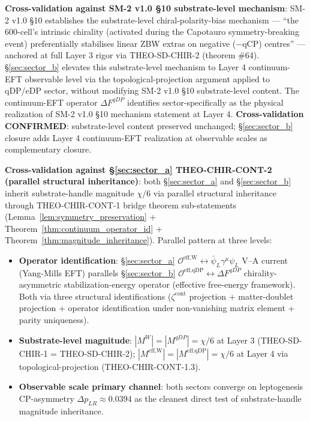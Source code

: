 \documentclass[11pt,letterpaper]{article}
\newcommand{\DeltapLR}{\Delta p_{LR}}
\newcommand{\OeffW}{\mathcal{O}^{\text{eff,W}}}
\newcommand{\OeffqDP}{\mathcal{O}^{\text{eff,qDP}}}
\newcommand{\DeltaFqDP}{\Delta F^{qDP}}
\begin{document}
\textbf{Cross-validation against SM-2 v1.0 §10 substrate-level mechanism}: SM-2 v1.0 §10 establishes the substrate-level chiral-polarity-bias mechanism --- ``the 600-cell's intrinsic chirality (activated during the Capotauro symmetry-breaking event) preferentially stabilises linear ZBW extras on negative ($-$qCP) centres'' \cite{SM2v1} --- anchored at full Layer 3 rigor via THEO-SD-CHIR-2 (theorem \#64). §\ref{sec:sector_b} elevates this substrate-level mechanism to Layer 4 continuum-EFT observable level via the topological-projection argument applied to qDP/eDP sector, without modifying SM-2 v1.0 §10 substrate-level content. The continuum-EFT operator $\DeltaFqDP$ identifies sector-specifically as the physical realization of SM-2 v1.0 §10 mechanism statement at Layer 4. \textbf{Cross-validation CONFIRMED}: substrate-level content preserved unchanged; §\ref{sec:sector_b} closure adds Layer 4 continuum-EFT realization at observable scales as complementary closure.

\textbf{Cross-validation against §\ref{sec:sector_a} THEO-CHIR-CONT-2 (parallel structural inheritance)}: both §\ref{sec:sector_a} and §\ref{sec:sector_b} inherit substrate-handle magnitude $\chi/6$ via parallel structural inheritance through THEO-CHIR-CONT-1 bridge theorem sub-statements (Lemma~\ref{lem:symmetry_preservation} + Theorem~\ref{thm:continuum_operator_id} + Theorem~\ref{thm:magnitude_inheritance}). Parallel pattern at three levels:

\begin{itemize}[leftmargin=*]
\item \textbf{Operator identification}: §\ref{sec:sector_a} $\OeffW \leftrightarrow \bar{\psi}_L\gamma^\mu\psi_L$ V--A current (Yang-Mills EFT) parallels §\ref{sec:sector_b} $\OeffqDP \leftrightarrow \DeltaFqDP$ chirality-asymmetric stabilization-energy operator (effective free-energy framework). Both via three structural identifications ($\zeta^{\text{cont}}$ projection + matter-doublet projection + operator identification under non-vanishing matrix element + parity uniqueness).
\item \textbf{Substrate-level magnitude}: $|M^W| = |M^{qDP}| = \chi/6$ at Layer 3 (THEO-SD-CHIR-1 = THEO-SD-CHIR-2); $|M^{\text{eff,W}}| = |M^{\text{eff,qDP}}| = \chi/6$ at Layer 4 via topological-projection (THEO-CHIR-CONT-1.3).
\item \textbf{Observable scale primary channel}: both sectors converge on leptogenesis CP-asymmetry $\DeltapLR \approx 0.0394$ as the cleanest direct test of substrate-handle magnitude inheritance.
\end{itemize}
\end{document}
